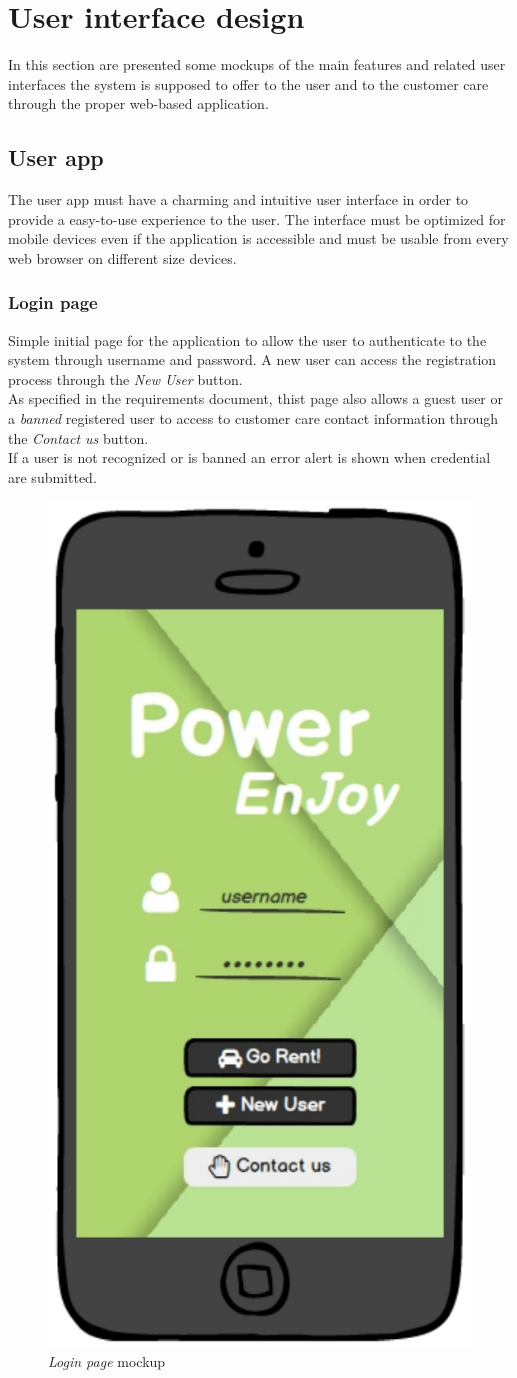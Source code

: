 \section{User interface design}
In this section are presented some mockups of the main features and related user interfaces the system is supposed to offer to the user and to the customer care through the proper web-based application.
\subsection{User app}
The user app must have a charming and intuitive user interface in order to provide a easy-to-use experience to the user. The interface must be optimized for mobile devices even if the application is accessible and must be usable from every web browser on different size devices.

\subsubsection{Login page}
Simple initial page for the application to allow the user to authenticate to the system through username and password. A new user can access the registration process through the \emph{New User} button. \\
As specified in the requirements document, thist page also allows a guest user or a \emph{banned} registered user to access to customer care contact information through the \emph{Contact us} button. \\
If a user is not recognized or is banned an error alert is shown when credential are submitted.

	\begin{figure}[h]
			\centering
			\includegraphics[width=0.4\linewidth]{mockups/loginPage}
			\caption{
				\label{fig:loginPage} 
				\emph{Login page} mockup
			}
		\end{figure}
		

